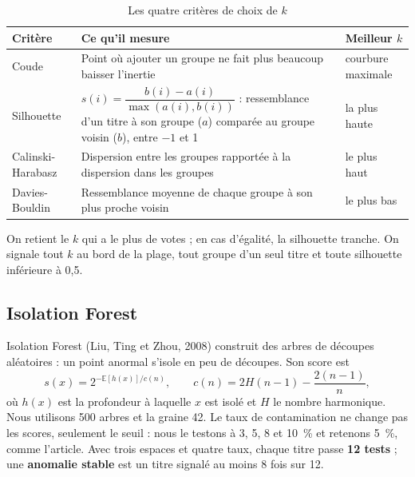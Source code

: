 \documentclass[11pt,a4paper]{article}
\newcommand{\pc}{~\%}
\begin{document}
\begin{table}[H]\centering\small
\caption{Les quatre critères de choix de $k$}\label{tab:criteres}
\begin{tabular}{lp{7.6cm}l}\toprule
Critère & Ce qu'il mesure & Meilleur $k$ \\ \midrule
Coude & Point où ajouter un groupe ne fait plus beaucoup baisser l'inertie & courbure maximale \\
Silhouette & $s(i) = \dfrac{b(i)-a(i)}{\max(a(i),b(i))}$ : ressemblance d'un titre à son groupe ($a$) comparée au groupe voisin ($b$), entre $-1$ et 1 & la plus haute \\
Calinski-Harabasz & Dispersion entre les groupes rapportée à la dispersion dans les groupes & le plus haut \\
Davies-Bouldin & Ressemblance moyenne de chaque groupe à son plus proche voisin & le plus bas \\
\bottomrule\end{tabular}
\end{table}

On retient le $k$ qui a le plus de votes ; en cas d'égalité, la silhouette tranche. On signale tout $k$ au bord de la plage, tout groupe d'un seul titre et toute silhouette inférieure à 0,5.

\subsection{Isolation Forest}
Isolation Forest (Liu, Ting et Zhou, 2008) construit des arbres de découpes aléatoires : un point anormal s'isole en peu de découpes. Son score est
\begin{equation}
s(x) = 2^{-\mathbb{E}[h(x)]/c(n)}, \qquad c(n) = 2H(n-1) - \frac{2(n-1)}{n},
\end{equation}
où $h(x)$ est la profondeur à laquelle $x$ est isolé et $H$ le nombre harmonique. Nous utilisons 500 arbres et la graine 42. Le taux de contamination ne change pas les scores, seulement le seuil : nous le testons à 3, 5, 8 et 10\pc{} et retenons 5\pc{}, comme l'article. Avec trois espaces et quatre taux, chaque titre passe \textbf{12 tests} ; une \textbf{anomalie stable} est un titre signalé au moins 8 fois sur 12.
\end{document}
